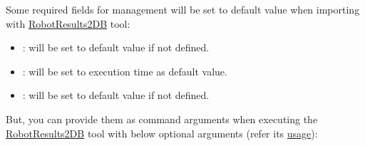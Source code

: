 Some required fields for management will be set to default value when
importing with
\href{https://github.com/test-fullautomation/robotframework-testresultwebapptool}{RobotResults2DB}
tool:

\begin{itemize}
\tightlist
\item {}: will be set to default value  if not defined.

\item {}: will be set to execution time
   as default value.

\item {}: will be set to default value  if not
  defined.
\end{itemize}

But, you can provide them as command arguments when executing the
\href{https://github.com/test-fullautomation/robotframework-testresultwebapptool}{RobotResults2DB}
tool with below optional arguments (refer its
\href{https://github.com/test-fullautomation/robotframework-testresultwebapptool\#usage}{usage}):

